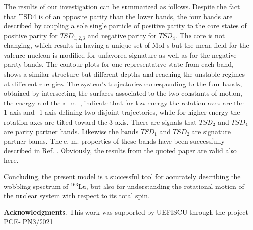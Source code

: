 \documentclass[twocolumn,article,amsmath,amssymb,floatfix,aps]{revtex4}
\begin{document}
The results of our investigation can be summarized as follows.  Despite the fact that TSD4 is of an opposite parity than the lower bands, the four bands are described by coupling a sole single particle of positive parity to the core states of positive parity for $TSD_{1,2,3}$ and negative parity for $TSD_4$.  The core is not changing, which results in having a unique set of MoI-s but the mean field for the valence nucleon is modified for unfavored signature as well as for the negative parity bands.  The contour plots for one representative state from each band, shows a similar structure but different depths and reaching the unstable regimes at different energies.  The system's trajectories corresponding to the four bands, obtained by intersecting the surfaces associated to the two constants of motion, the energy and the a. m. , indicate that for low energy the rotation axes are the 1-axis and -1-axis defining two disjoint trajectories, while for higher energy the rotation axes are tilted toward the 3-axis. There are signals that $TSD_2$ and $TSD_4$ are parity partner bands.  Likewise the bands $TSD_1$ and $TSD_2$ are signature partner bands.  The e. m.  properties of these bands have been successfully described in Ref. \cite{raduta2020new}.  Obviously, the results from the quoted paper are valid also here. 

Concluding, the present model is a successful tool for accurately describing the wobbling spectrum of $^{163}$Lu, but also for understanding the rotational motion of the nuclear system with respect to its total spin. 

{\bf Acknowledgments}. This work was supported by UEFISCU through the project PCE- PN3/2021
\end{document}
